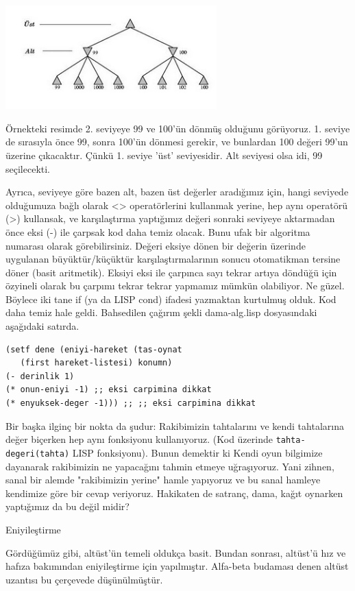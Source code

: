 \documentclass[12pt,fleqn]{article}\usepackage{../../common}
\begin{document}
\includegraphics[height=4cm]{altust.jpg}

Örnekteki resimde 2. seviyeye 99 ve 100'ün dönmüş olduğunu
görüyoruz. 1. seviye de sırasıyla önce 99, sonra 100'ün dönmesi gerekir, ve
bunlardan 100 değeri 99'un üzerine çıkacaktır. Çünkü 1. seviye 'üst'
seviyesidir. Alt seviyesi olsa idi, 99 seçilecekti.

Ayrıca, seviyeye göre bazen alt, bazen üst değerler aradığımız için, hangi
seviyede olduğumuza bağlı olarak <> operatörlerini kullanmak yerine, hep aynı
operatörü (>) kullansak, ve karşılaştırma yaptığımız değeri sonraki seviyeye
aktarmadan önce eksi (-) ile çarpsak kod daha temiz olacak. Bunu ufak bir
algoritma numarası olarak görebilirsiniz. Değeri eksiye dönen bir değerin
üzerinde uygulanan büyüktür/küçüktür karşılaştırmalarının sonucu
otomatikman tersine döner (basit aritmetik). Eksiyi eksi ile çarpınca sayı
tekrar artıya döndüğü için özyineli olarak bu çarpımı tekrar tekrar
yapmamız mümkün olabiliyor. Ne güzel. Böylece iki tane if (ya da LISP cond)
ifadesi yazmaktan kurtulmuş olduk. Kod daha temiz hale geldi. Bahsedilen
çağırım şekli dama-alg.lisp dosyasındaki aşağıdaki satırda.

\begin{verbatim}
(setf dene (eniyi-hareket (tas-oynat 
   (first hareket-listesi) konumn)
(- derinlik 1)
(* onun-eniyi -1) ;; eksi carpimina dikkat
(* enyuksek-deger -1))) ;; ;; eksi carpimina dikkat
\end{verbatim}

Bir başka ilginç bir nokta da şudur: Rakibimizin tahtalarını ve kendi
tahtalarına değer biçerken hep aynı fonksiyonu kullanıyoruz. (Kod üzerinde
\verb!tahta-degeri(tahta)! LISP fonksiyonu). Bunun demektir ki Kendi oyun
bilgimize dayanarak rakibimizin ne yapacağını tahmin etmeye
uğraşıyoruz. Yani zihnen, sanal bir alemde "rakibimizin yerine" hamle
yapıyoruz ve bu sanal hamleye kendimize göre bir cevap veriyoruz. Hakikaten
de satranç, dama, kağıt oynarken yaptığımız da bu değil midir?

Eniyileştirme

Gördüğümüz gibi, altüst'ün temeli oldukça basit. Bundan sonrası, altüst'ü
hız ve hafıza bakımından eniyileştirme için yapılmıştır. Alfa-beta budaması
denen altüst uzantısı bu çerçevede düşünülmüştür.
\end{document}
